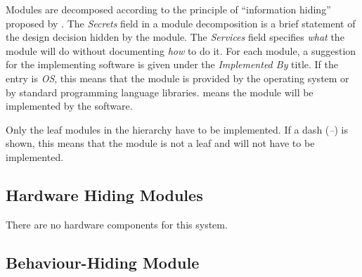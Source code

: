 \documentclass[12pt, titlepage]{article}
\begin{document}
Modules are decomposed according to the principle of ``information hiding''
proposed by \citet{ParnasEtAl1984}. The \emph{Secrets} field in a module
decomposition is a brief statement of the design decision hidden by the
module. The \emph{Services} field specifies \emph{what} the module will do
without documenting \emph{how} to do it. For each module, a suggestion for the
implementing software is given under the \emph{Implemented By} title. If the
entry is \emph{OS}, this means that the module is provided by the operating
system or by standard programming language libraries.  \emph{\progname{}} means the
module will be implemented by the \progname{} software.

Only the leaf modules in the hierarchy have to be implemented. If a dash
(\emph{--}) is shown, this means that the module is not a leaf and will not have
to be implemented.

\subsection{Hardware Hiding Modules}

There are no hardware components for this system.
\subsection{Behaviour-Hiding Module}

\end{document}
